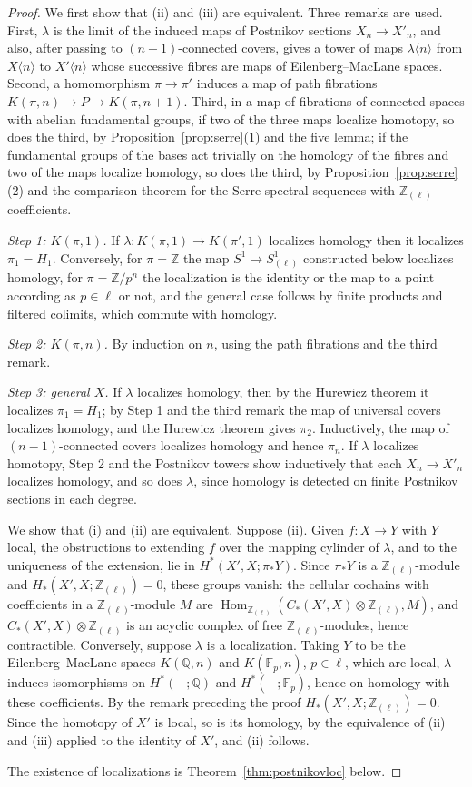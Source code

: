 \documentclass[11pt]{amsart}
\theoremstyle{plain}
\theoremstyle{definition}
\numberwithin{equation}{section}
\newcommand{\Z}{\mathbb{Z}}
\newcommand{\Q}{\mathbb{Q}}
\newcommand{\F}{\mathbb{F}}
\newcommand{\Zl}{\mathbb{Z}_{(\ell)}}
\DeclareMathOperator{\Hom}{Hom}
\begin{document}
\begin{proof}
We first show that (ii) and (iii) are equivalent.
Three remarks are used.
First, $\lambda$ is the limit of the induced maps of Postnikov sections $X_n\to X'_n$, and also, after passing to $(n-1)$-connected covers, gives a tower of maps $\lambda\langle n\rangle$ from $X\langle n\rangle$ to $X'\langle n\rangle$ whose successive fibres are maps of Eilenberg--MacLane spaces.
Second, a homomorphism $\pi\to\pi'$ induces a map of path fibrations $K(\pi,n)\to P\to K(\pi,n+1)$.
Third, in a map of fibrations of connected spaces with abelian fundamental groups, if two of the three maps localize homotopy, so does the third, by Proposition~\ref{prop:serre}(1) and the five lemma; if the fundamental groups of the bases act trivially on the homology of the fibres and two of the maps localize homology, so does the third, by Proposition~\ref{prop:serre}(2) and the comparison theorem for the Serre spectral sequences with $\Zl$ coefficients.

\emph{Step 1: $K(\pi,1)$.}
If $\lambda\colon K(\pi,1)\to K(\pi',1)$ localizes homology then it localizes $\pi_1=H_1$.
Conversely, for $\pi=\Z$ the map $S^1\to S^1_{(\ell)}$ constructed below localizes homology, for $\pi=\Z/p^n$ the localization is the identity or the map to a point according as $p\in\ell$ or not, and the general case follows by finite products and filtered colimits, which commute with homology.

\emph{Step 2: $K(\pi,n)$.}
By induction on $n$, using the path fibrations and the third remark.

\emph{Step 3: general $X$.}
If $\lambda$ localizes homology, then by the Hurewicz theorem it localizes $\pi_1=H_1$; by Step 1 and the third remark the map of universal covers localizes homology, and the Hurewicz theorem gives $\pi_2$.
Inductively, the map of $(n-1)$-connected covers localizes homology and hence $\pi_n$.
If $\lambda$ localizes homotopy, Step 2 and the Postnikov towers show inductively that each $X_n\to X'_n$ localizes homology, and so does $\lambda$, since homology is detected on finite Postnikov sections in each degree.

We show that (i) and (ii) are equivalent.
Suppose (ii).
Given $f\colon X\to Y$ with $Y$ local, the obstructions to extending $f$ over the mapping cylinder of $\lambda$, and to the uniqueness of the extension, lie in $H^{*}(X',X;\pi_*Y)$.
Since $\pi_*Y$ is a $\Zl$-module and $H_*(X',X;\Zl)=0$, these groups vanish: the cellular cochains with coefficients in a $\Zl$-module $M$ are $\Hom_{\Zl}(C_*(X',X)\otimes\Zl,M)$, and $C_*(X',X)\otimes\Zl$ is an acyclic complex of free $\Zl$-modules, hence contractible.
Conversely, suppose $\lambda$ is a localization.
Taking $Y$ to be the Eilenberg--MacLane spaces $K(\Q,n)$ and $K(\F_p,n)$, $p\in\ell$, which are local, $\lambda$ induces isomorphisms on $H^*(-;\Q)$ and $H^*(-;\F_p)$, hence on homology with these coefficients.
By the remark preceding the proof $H_*(X',X;\Zl)=0$.
Since the homotopy of $X'$ is local, so is its homology, by the equivalence of (ii) and (iii) applied to the identity of $X'$, and (ii) follows.

The existence of localizations is Theorem~\ref{thm:postnikovloc} below.
\end{proof}
\end{document}
